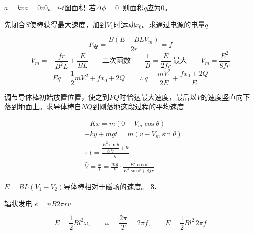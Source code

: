 $a=kv$\qquad $a=0$\qquad $v$$0$。
$i$-$t$图面积\ 若$\Delta\phi=0$\ 则面积$q$应为$0$。
\begin{problem}[圈注“求和”]
先闭合$S$使棒获得最大速度，加到$V_1$时运动$x_0$。求通过电源的电量$q$
\begin{solution}
\[
F_{\text{安}}=\frac{B(E-BLV_m)}{2r}=f
\]
\[
V_m=-\frac{fr}{B^2L}+\frac{E}{BL}\qquad\text{二次函数}\qquad \frac1B=\frac{E}{2fr}\ \text{最大}\qquad V_m=\frac{E^2}{8fr}
\]
\[
Eq=\frac12mV_1^{\,2}+fx_0+2Q\qquad\therefore\ q=\frac{mV_1^{2}}{2E}+\frac{fx_0+2Q}{E}
\]
\end{solution}
\end{problem}
\begin{problem}
调节导体棒初始放置位置，使之到$PQ$时恰达最大速度，最后以$V$的速度竖直向下落到地面上。求导体棒自$NQ$到刚落地这段过程的平均速度
\begin{solution}
\medskip
\noindent\hspace{2cm}
\begin{align*}
&-Kx=m(0-V_m\cos\theta)\\
&-ky+mgt=m(v-V_m\sin\theta)\\
&\therefore\ t=\frac{\dfrac{E^2\sin\theta}{8fr}+V}{g}\\
&\bar V=\frac{x}{t}=\frac{mg}{k}\cdot\frac{E^2\cos\theta}{E^2\sin\theta+8fr}
\end{align*}
\end{solution}
\end{problem}
$E=BL(V_1-V_2)$\quad 导体棒相对于磁场的速度。
\textbf{3.}

辐状发电 $e=nB2\pi rv$

\[ E=\frac12 Bl^{2}\omega,\qquad \omega=\frac{2\pi}{T}=2\pi f,\qquad E=\frac12 Bl^{2}\,2\pi f \]

